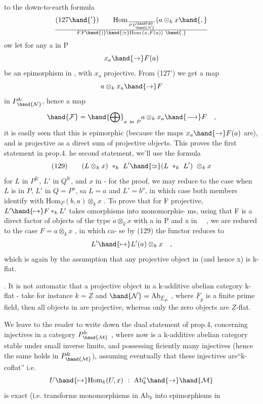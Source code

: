 
to the down-to-earth formula
\[ (127\hand{'})\qquad \mathrm{Hom}_{\over{P}{P}^{\hand{\&}}_{\hand{\mathcal{N}}}}(a\otimes_k x\hand{,}\over{F}{F}\hand{)}\hand{\simeq}\mathrm{Hom}\,(x,F(a))\ \hand{.} \]
ow let for any a in P
\[ x_a\hand{\to} F(a) \]
be an epimorphism in , with $x_a$ projective. From (127') we get a map
\[ a\otimes_k x_a\hand{\to} F \]
in $P^{\&}_{\hand{\mathcal{N}}}$, hence a map
\[ \hand{\mathcal{F}} = \hand{\bigoplus}_{a\ \mathrm{in}\ P} a\otimes_k x_a \hand{\longrightarrow} F\quad , \]
it is easily seen that this is epimorphic (because the maps $x_a\hand{\to} F(a)$
are), and  is projective as a direct sum of projective objects. This
proves the first statement in prop.4.  he second statement, we'll use
the formula
\[ (129)\qquad (L\otimes_k x)\ *_k\ L'\hand{\simeq}(L\ *_k\ L')\ \otimes_k x \]
for $L$ in $P^{\&}$, $L'$ in $Q^{\&}$, and $x$ in  - for the proof, we may reduce
to the case when $L$ is in $P$, $L'$ in $Q=P^{o}$, sa $L=a$ and $L'=b^{o}$,
in which case both members identify with $\mathrm{Hom}_P(b,a)\otimes_k x$ . To prove that
for F projective, $L'\hand{\mapsto} F *_k L'$ takes omorphisms into monomorphis-%
ms, using that F is a direct factor of objects of the type $a\otimes_k x$ with
a in P and x in \ \ , we are reduced to the case $F = a\otimes_k x$ , in which ca-%
se by (129) the functor reduces to
\[ L'\hand{\mapsto} L'(a)\otimes_k x\quad , \]
which is again  by the assumption that  any projective object in
(and hence x) is k-flat.

\hand{\uline{\textcolor{black}{Remark}}}. It is not automatic that a projective object in a k-additive
abelian category  k-flat - take for instance $k=\underline{Z}$ and $\hand{\mathcal{N}}= \mathrm{Ab}_{\underline{F}_p}$ ,
where $\underline{F}_p$ is a finite prime field, then  all objects in
 are projective, whereas only the zero objects are $\underline{Z}$-flat.

We leave to the reader to write down the dual statement of prop.4,
concerning injectives in a category $P^{\&}_{\hand{\mathcal{M}}}$ , where now  is a k-additive
abelian category stable under small inverse limits, and possessing
ficiently many injectives (hence the same holds in $P^{\&}_{\hand{\mathcal{M}}}$),  assuming
eventually that these injectives are``k-coflat'' i.e.
\[ U\hand{\mapsto}\mathrm{Hom}_k(U,x)\ :\ \mathrm{Ab}_k^{o}\hand{\to}\hand{\mathcal{M}} \]
is exact (i.e. transforms monomorphisms in $\mathrm{Ab}_k$ into epimorphisms in

